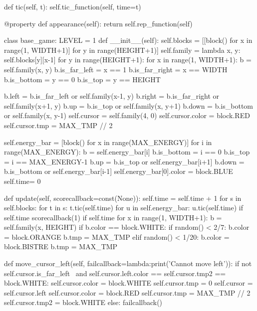 \documentclass[UTF8]{article}
\begin{document}
\begin{python}
    def tic(self, t):
        self.tic_function(self, time=t)
        
    @property
    def appearance(self):
        return self.rep_function(self)

class base_game:
    LEVEL = 1
    def __init__(self):
        self.blocks = [[block() for x in range(1, WIDTH+1)] for y in range(HEIGHT+1)]
        self.family = lambda x, y: self.blocks[y][x-1]
        for y in range(HEIGHT+1):
            for x in range(1, WIDTH+1):
                b = self.family(x, y)
                b.is_far_left  = x == 1
                b.is_far_right = x == WIDTH
                b.is_bottom    = y == 0
                b.is_top       = y == HEIGHT
                
                b.left  = b.is_far_left  or self.family(x-1, y)
                b.right = b.is_far_right or self.family(x+1, y)
                b.up    = b.is_top       or self.family(x, y+1)
                b.down  = b.is_bottom    or self.family(x, y-1)
        self.cursor = self.family(4, 0)
        self.cursor.color = block.RED
        self.cursor.tmp = MAX_TMP // 2
        
        self.energy_bar = [block() for x in range(MAX_ENERGY)]
        for i in range(MAX_ENERGY):
            b = self.energy_bar[i]
            b.is_bottom = i == 0
            b.is_top    = i == MAX_ENERGY-1
            b.up   = b.is_top    or self.energy_bar[i+1]
            b.down = b.is_bottom or self.energy_bar[i-1] 
        self.energy_bar[0].color = block.BLUE
        self.time= 0
    
    def update(self, scorecallback=const(None)):
        self.time = self.time + 1
        for s in self.blocks:
            for t in s:
                t.tic(self.time)
        for u in self.energy_bar:
            u.tic(self.time)
        if self.time %
            scorecallback(1)
        if self.time %
            for x in range(1, WIDTH+1):
                b = self.family(x, HEIGHT)
                if b.color == block.WHITE:
                    if random() < 2/7:
                        b.color = block.ORANGE
                        b.tmp = MAX_TMP
                    elif random() < 1/20:
                        b.color = block.BISTRE
                        b.tmp = MAX_TMP
        
    def move_cursor_left(self, failcallback=lambda:print('Cannot move left')):
        if not self.cursor.is_far_left \
            and self.cursor.left.color == self.cursor.tmp2 == block.WHITE:
            self.cursor.color = block.WHITE
            self.cursor.tmp = 0
            self.cursor = self.cursor.left
            self.cursor.color = block.RED
            self.cursor.tmp = MAX_TMP // 2
            self.cursor.tmp2 = block.WHITE
        else:
            failcallback()
        

\end{python}
\end{document}
